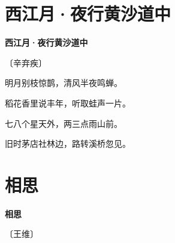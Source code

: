 \documentclass[12pt,UTF-8,openany,fontset=none]{ctexbook}
\begin{document}
\vspace{8pt}
\clearpage

\section{西江月·夜行黄沙道中}


\begin{center}
    {\bfseries 西江月·夜行黄沙道中}

    \vspace{18pt}

    \begin{large}\xuwen
        〔辛弃疾〕
    \end{large}

\end{center}

    \vspace{18pt}  %

\begin{center}
    \begin{Large}

        明月别枝惊鹊，清风半夜鸣蝉。

        稻花香里说丰年，听取蛙声一片。

        \vspace{18pt}  %

        七八个星天外，两三点雨山前。

        旧时茅店社林边，路转溪桥忽见。

    \end{Large}

\end{center}

\vspace{8pt}
\clearpage

\section{相思}


\begin{center}
    {\bfseries 相思}

    \vspace{18pt}

    \begin{large}\xuwen
        〔王维〕
    \end{large}

\end{center}
\end{document}
